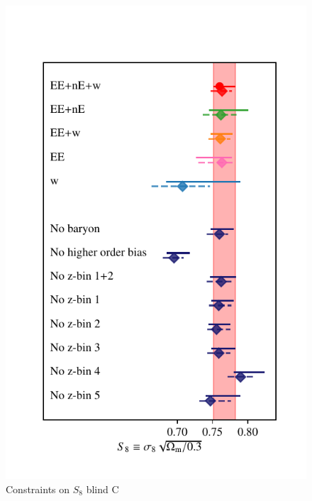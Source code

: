 \begin{figure}
	\begin{center}
		\includegraphics[width=\columnwidth]{Parameter_Plots/S8_comparison_blindC}
		\caption{Constraints on $S_{8}$ blind C}
		\label{fig:cosmology-params}
	\end{center}
\end{figure}

